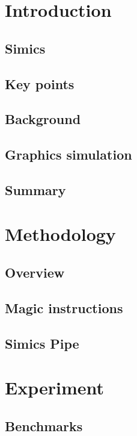 \documentclass{beamer}
\begin{document}
	

	\section{Introduction}

	\subsection{Simics}
	

	\subsection{Key points}
	

        \subsection{Background}
        

	\subsection{Graphics simulation}
	

	\subsection{Summary}
	

	\section{Methodology}
	\subsection{Overview}
	
	\subsection{Magic instructions}
	
	\subsection{Simics Pipe}
	

	\section{Experiment}
	\subsection{Benchmarks}
	
\end{document}
